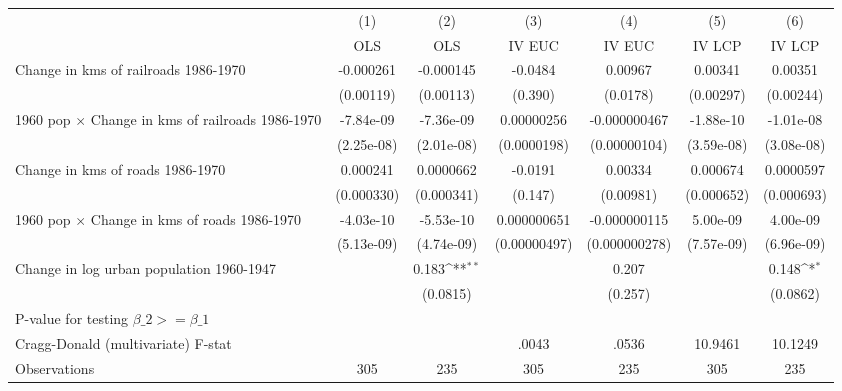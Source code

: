 {
\def\sym#1{\ifmmode^{#1}\else\(^{#1}\)\fi}
\begin{tabular}{l*{6}{c}}
\hline\hline
                &\multicolumn{1}{c}{(1)}&\multicolumn{1}{c}{(2)}&\multicolumn{1}{c}{(3)}&\multicolumn{1}{c}{(4)}&\multicolumn{1}{c}{(5)}&\multicolumn{1}{c}{(6)}\\
                &\multicolumn{1}{c}{OLS}&\multicolumn{1}{c}{OLS}&\multicolumn{1}{c}{IV EUC}&\multicolumn{1}{c}{IV EUC}&\multicolumn{1}{c}{IV LCP}&\multicolumn{1}{c}{IV LCP}\\
\hline
Change in kms of railroads 1986-1970&-0.000261         &-0.000145         &  -0.0484         &  0.00967         &  0.00341         &  0.00351         \\
                &(0.00119)         &(0.00113)         &  (0.390)         & (0.0178)         &(0.00297)         &(0.00244)         \\
[1em]
1960 pop $\times$ Change in kms of railroads 1986-1970&-7.84e-09         &-7.36e-09         &0.00000256         &-0.000000467         &-1.88e-10         &-1.01e-08         \\
                &(2.25e-08)         &(2.01e-08)         &(0.0000198)         &(0.00000104)         &(3.59e-08)         &(3.08e-08)         \\
[1em]
Change in kms of roads 1986-1970& 0.000241         &0.0000662         &  -0.0191         &  0.00334         & 0.000674         &0.0000597         \\
                &(0.000330)         &(0.000341)         &  (0.147)         &(0.00981)         &(0.000652)         &(0.000693)         \\
[1em]
1960 pop $\times$ Change in kms of roads 1986-1970&-4.03e-10         &-5.53e-10         &0.000000651         &-0.000000115         & 5.00e-09         & 4.00e-09         \\
                &(5.13e-09)         &(4.74e-09)         &(0.00000497)         &(0.000000278)         &(7.57e-09)         &(6.96e-09)         \\
[1em]
Change in log urban population 1960-1947&                  &    0.183\sym{**} &                  &    0.207         &                  &    0.148\sym{*}  \\
                &                  & (0.0815)         &                  &  (0.257)         &                  & (0.0862)         \\
\hline
P-value for testing $\beta\_{2} >= \beta\_{1}$&                  &                  &                  &                  &                  &                  \\
Cragg-Donald (multivariate) F-stat&                  &                  &    .0043         &    .0536         &  10.9461         &  10.1249         \\
Observations    &      305         &      235         &      305         &      235         &      305         &      235         \\
\hline\hline
\end{tabular}
}
